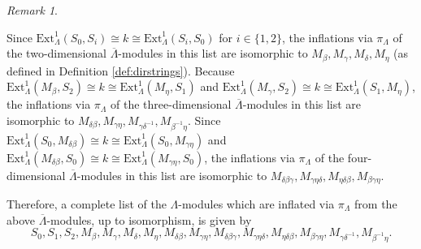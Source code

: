 \documentclass{amsart}
\theoremstyle{plain}
\theoremstyle{definition}
\theoremstyle{remark}
\newtheorem{rem}[thm]{Remark}
\begin{document}
\begin{rem}
\begin{enumerate}
Since $\mathrm{Ext}^1_\Lambda(S_0,S_i)\cong k \cong\mathrm{Ext}^1_\Lambda(S_i,S_0)$ for
$i\in\{1,2\}$, the inflations via $\pi_\Lambda$ of the two-dimensional $\overline{\Lambda}$-modules in this list 
are isomorphic to $M_\beta, M_\gamma, M_\delta, M_\eta$ (as defined in Definition \ref{def:dirstrings}).
Because $\mathrm{Ext}^1_\Lambda(M_\beta,S_2)\cong k\cong \mathrm{Ext}^1_\Lambda(M_\eta,S_1)$
and $\mathrm{Ext}^1_\Lambda(M_\gamma,S_2)\cong k\cong \mathrm{Ext}^1_\Lambda(S_1,M_\eta)$,
the inflations via $\pi_\Lambda$ of the three-dimensional $\overline{\Lambda}$-modules in this list 
are isomorphic to $M_{\delta\beta},M_{\gamma\eta}, M_{\gamma\delta^{-1}},M_{\beta^{-1}\eta}$. 
Since $\mathrm{Ext}^1_\Lambda(S_0,M_{\delta\beta})\cong 
k\cong\mathrm{Ext}^1_\Lambda(S_0,M_{\gamma\eta})$ and 
$\mathrm{Ext}^1_\Lambda(M_{\delta\beta},S_0)\cong k\cong 
\mathrm{Ext}^1_\Lambda(M_{\gamma\eta},S_0)$, the inflations via $\pi_\Lambda$ of the four-dimensional 
$\overline{\Lambda}$-modules in this list  are isomorphic to
$M_{\delta\beta\gamma}, M_{\gamma\eta\delta},M_{\eta\delta\beta},M_{\beta\gamma\eta}$.

Therefore, a complete list of the $\Lambda$-modules which are inflated via $\pi_\Lambda$
from the above $\overline{\Lambda}$-modules, up to isomorphism, is given by
$$S_0,S_1, S_2, M_\beta, M_\gamma, M_\delta, M_\eta, M_{\delta\beta},
M_{\gamma\eta}, M_{\delta\beta\gamma}, M_{\gamma\eta\delta},M_{\eta\delta\beta},
M_{\beta\gamma\eta}, M_{\gamma\delta^{-1}},M_{\beta^{-1}\eta}.$$


\end{enumerate}
\end{rem}
\end{document}
